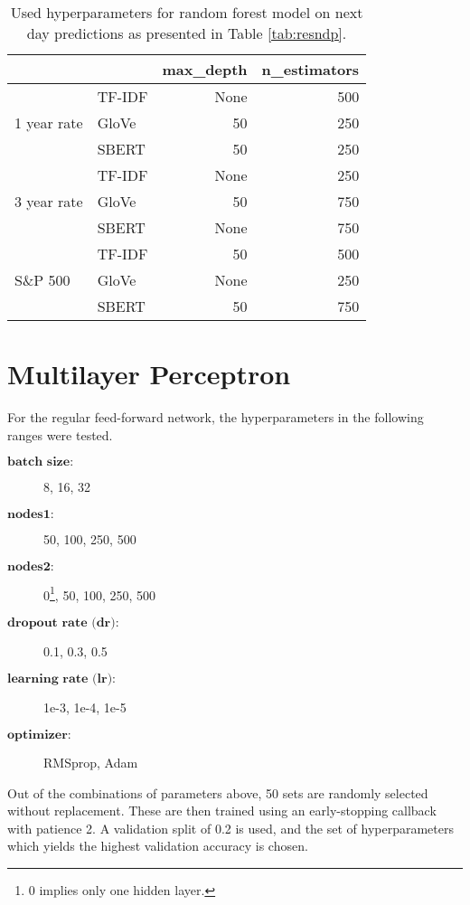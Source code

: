 \begin{table}[H]
    \centering
    \begin{tabular}{llrr}
          & & \textbf{max\_depth} & \textbf{n\_estimators} \\
         \hline \hline
         \multirow{3}{*}{1 year rate} & TF-IDF & None & 500   \\
         & GloVe & 50 & 250    \\
         & SBERT & 50 & 250   \\
         \hline 
         \multirow{3}{*}{3 year rate} & TF-IDF & None & 250   \\
         & GloVe & 50 & 750 \\
         & SBERT & None & 750 \\
         \hline 
         \multirow{3}{*}{S\&P 500} & TF-IDF & 50 & 500 \\
         & GloVe & None & 250 \\
         & SBERT & 50 & 750 \\
         \hline 
    \end{tabular}
    \caption{Used hyperparameters for random forest model on next day predictions as presented in Table \ref{tab:resndp}.}
    \label{tab:rf_hyper_nd}
\end{table}


\section{Multilayer Perceptron}

For the regular feed-forward network, the hyperparameters in the following ranges were tested. 

\begin{description}
    \item[$\textbf{batch size}:$] 8, 16, 32
    \item[$\textbf{nodes1}:$] 50, 100, 250, 500
    \item[$\textbf{nodes2}:$] 0\footnote{0 implies only one hidden layer.}, 50, 100, 250, 500
    \item[$\textbf{dropout rate (dr)}:$] 0.1, 0.3, 0.5
    \item[$\textbf{learning rate (lr)}:$] 1e-3, 1e-4, 1e-5
    \item[$\textbf{optimizer}:$]  RMSprop, Adam
\end{description}

Out of the combinations of parameters above, 50 sets are randomly selected without replacement. These are then trained using an early-stopping callback with patience 2. A validation split of 0.2 is used, and the set of hyperparameters which yields the highest validation accuracy is chosen. 

